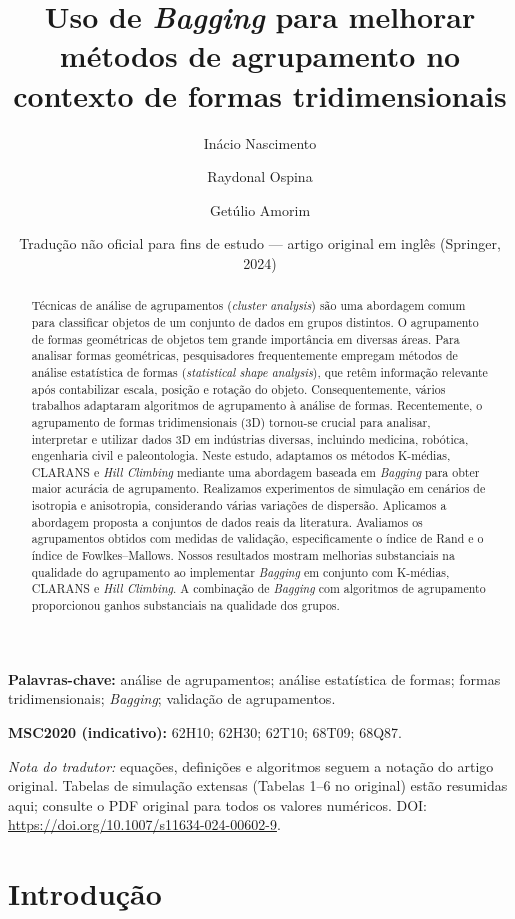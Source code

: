 \documentclass[11pt,a4paper]{article}
\title{Uso de \emph{Bagging} para melhorar métodos de agrupamento no contexto de formas tridimensionais}
\author{Inácio Nascimento \and Raydonal Ospina \and Getúlio Amorim}
\date{Tradução não oficial para fins de estudo --- artigo original em inglês (Springer, 2024)}
\begin{document}
\maketitle

\begin{abstract}
Técnicas de análise de agrupamentos (\emph{cluster analysis}) são uma abordagem comum para classificar objetos de um conjunto de dados em grupos distintos. O agrupamento de formas geométricas de objetos tem grande importância em diversas áreas. Para analisar formas geométricas, pesquisadores frequentemente empregam métodos de análise estatística de formas (\emph{statistical shape analysis}), que retêm informação relevante após contabilizar escala, posição e rotação do objeto. Consequentemente, vários trabalhos adaptaram algoritmos de agrupamento à análise de formas. Recentemente, o agrupamento de formas tridimensionais (3D) tornou-se crucial para analisar, interpretar e utilizar dados 3D em indústrias diversas, incluindo medicina, robótica, engenharia civil e paleontologia. Neste estudo, adaptamos os métodos K-médias, CLARANS e \emph{Hill Climbing} mediante uma abordagem baseada em \emph{Bagging} para obter maior acurácia de agrupamento. Realizamos experimentos de simulação em cenários de isotropia e anisotropia, considerando várias variações de dispersão. Aplicamos a abordagem proposta a conjuntos de dados reais da literatura. Avaliamos os agrupamentos obtidos com medidas de validação, especificamente o índice de Rand e o índice de Fowlkes--Mallows. Nossos resultados mostram melhorias substanciais na qualidade do agrupamento ao implementar \emph{Bagging} em conjunto com K-médias, CLARANS e \emph{Hill Climbing}. A combinação de \emph{Bagging} com algoritmos de agrupamento proporcionou ganhos substanciais na qualidade dos grupos.
\end{abstract}

\noindent\textbf{Palavras-chave:} análise de agrupamentos; análise estatística de formas; formas tridimensionais; \emph{Bagging}; validação de agrupamentos.

\noindent\textbf{MSC2020 (indicativo):} 62H10; 62H30; 62T10; 68T09; 68Q87.

\medskip
\noindent\textit{Nota do tradutor:} equações, definições e algoritmos seguem a notação do artigo original. Tabelas de simulação extensas (Tabelas 1--6 no original) estão resumidas aqui; consulte o PDF original para todos os valores numéricos. DOI: \url{https://doi.org/10.1007/s11634-024-00602-9}.

\section{Introdução}
\end{document}
